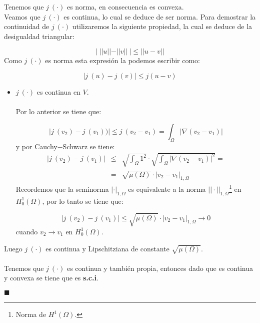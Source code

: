 \begin{demosteorema}
\begin{itemize}
\begin{enumerate}
\end{enumerate}

\end{itemize}
Tenemos que $j\ (\cdot )$ es norma, en consecuencia es convexa.\\ 

Veamos que $j\ (\cdot )$ es continua, lo cual se deduce de ser norma. Para
demostrar la continuidad de $j\ (\cdot )$ utilizaremos la siguiente propiedad,
la cual se deduce de la desigualdad triangular:

\begin{displaymath}
|\ ||u||-||v||\ |\le ||u-v||
\end{displaymath}
Como $j\ (\cdot )$ es norma esta expresi\'on la podemos escribir como:

\begin{displaymath}
|j\ (u)-j\ (v)|\le j(u-v)
\end{displaymath}

\begin{itemize}
\item $j\ (\cdot )$ es continua en $V$.\\ \\
Por lo anterior se tiene que:

\begin{displaymath}
|j\ (v_2)-j\ (v_1))|\le j\ (v_2-v_1) = \int_{\Omega }|\nabla (v_2-v_1)|
\end{displaymath}
y por Cauchy$-$Schwarz se tiene:
\begin{eqnarray*}
|j\ (v_2)-j\ (v_1)|&\le &\sqrt{\int_{\Omega} 1^2}\cdot
\sqrt{\int_{\Omega}|\nabla (v_2-v_1)|^2} = \\
&=& \sqrt{\mu(\Omega )}\cdot |v_2-v_1|_{1,\Omega }
\end{eqnarray*}
Recordemos que la seminorma $|\cdot |_{1,\Omega }$ es equivalente a la norma
$||\cdot ||_{1,\Omega }$\footnote{Norma de $H^1(\Omega )$.} en $H^1_0(\Omega )$,
por lo tanto se tiene que:

\begin{displaymath}
|j\ (v_2)-j\ (v_1)|\le \sqrt{\mu (\Omega )}\cdot |v_2-v_1|_{1,\Omega }
\longrightarrow 0
\end{displaymath}
cuando $v_2\to v_1$ en $H^1_0(\Omega )$.
\end{itemize}
Luego $j\ (\cdot )$ es continua y Lipschitziana de constante
$\sqrt{\mu (\Omega )}$.\\ \\
Tenemos que $j\ (\cdot )$ es continua y tambi\'en propia, entonces dado que es
continua y convexa se tiene que es \textbf{s.c.i}.

\begin{flushright}
$\blacksquare$
\end{flushright}
\end{demosteorema}

